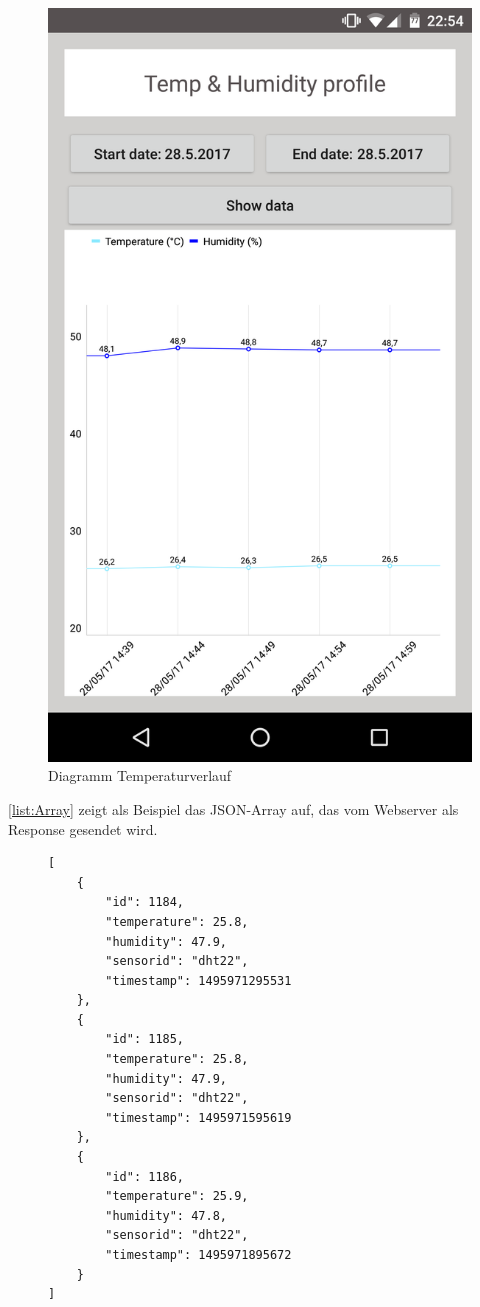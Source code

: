 \begin{figure}[H]
	\centering
	\includegraphics[scale=0.1]{images/appVerlauf}
	\caption{Diagramm Temperaturverlauf}
	\label{fig:temVerlauf}
\end{figure}

\autoref{list:Array} zeigt als Beispiel das \ac{JSON}-Array auf, das vom Webserver als Response gesendet wird. 
\begin{figure}


\begin{lstlisting}[label=list:Array, caption={Beispiel: JSON Array}]
[
	{
		"id": 1184,
		"temperature": 25.8,
		"humidity": 47.9,
		"sensorid": "dht22",
		"timestamp": 1495971295531
	},
	{
		"id": 1185,
		"temperature": 25.8,
		"humidity": 47.9,
		"sensorid": "dht22",
		"timestamp": 1495971595619
	},
	{
		"id": 1186,
		"temperature": 25.9,
		"humidity": 47.8,
		"sensorid": "dht22",
		"timestamp": 1495971895672
	}
]
\end{lstlisting}
\end{figure}

